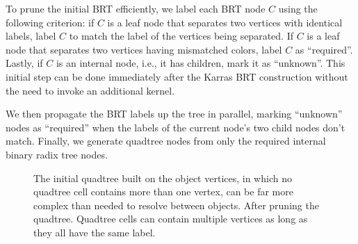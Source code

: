 \documentclass[final,3p,times,twocolumn]{elsarticle}
\begin{document}


To prune the initial BRT efficiently, we label each BRT node $C$ using the following criterion: if $C$ is a leaf node that separates two vertices with identical labels, label $C$ to match the label of the vertices being separated. If $C$ is a leaf node that separates two vertices having mismatched colors, label $C$ as ``required''. Lastly, if $C$ is an internal node, i.e., it has children, mark it as ``unknown''. This initial step can be done immediately after the Karras BRT construction without the need to invoke an additional kernel.

We then propagate the BRT labels up the tree in parallel, marking ``unknown'' nodes as ``required'' when the labels of the current node's two child nodes don't match. Finally, we generate quadtree nodes from only the required internal binary radix tree nodes.

\begin{figure}
  \centering
  \caption{
    \protect{} The initial quadtree built on the object vertices, in which no quadtree cell contains more than one vertex, can be far more complex than needed to resolve between objects.
    \protect{} After pruning the quadtree. Quadtree cells can contain multiple vertices as long as they all have the same label.
  }
  \label{fig:pruning}
\end{figure}
\end{document}
